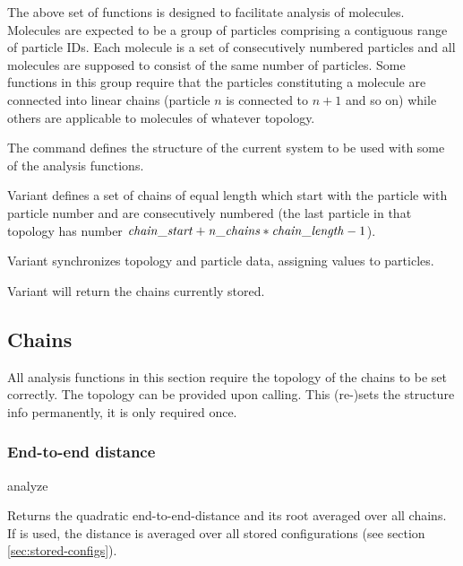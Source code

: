 The above set of functions is designed to facilitate analysis of
molecules. Molecules are expected to be a group of particles
comprising a contiguous range of particle IDs. Each molecule is a set
of consecutively numbered particles and all molecules are supposed to
consist of the same number of particles.  Some functions in this group
require that the particles constituting a molecule are connected into
linear chains (particle $n$ is connected to $n+1$ and so on) while
others are applicable to molecules of whatever topology.

The  command defines the structure of the current
system to be used with some of the analysis functions.

Variant  defines a set of  chains of equal
length  which start with the particle with particle
number  and are consecutively numbered (\ie the last
particle in that topology has number $\var{chain\_start} +
\var{n\_chains}*\var{chain\_length} - 1$). 

Variant  synchronizes topology and particle data, assigning
 values to particles.

Variant  will return the chains currently stored.



\subsection{Chains}

All analysis functions in this section require the topology of the
chains to be set correctly.  The topology can be provided upon
calling. This (re-)sets the structure info permanently, \ie it is only
required once.

\subsubsection{End-to-end distance}
\begin{pysyntax}
\end{pysyntax}
\begin{essyntax}
  analyze  
\end{essyntax}
Returns the quadratic end-to-end-distance and its root averaged over
all chains.  If  is used, the distance is averaged over all
stored configurations (see section \vref{sec:stored-configs}).

